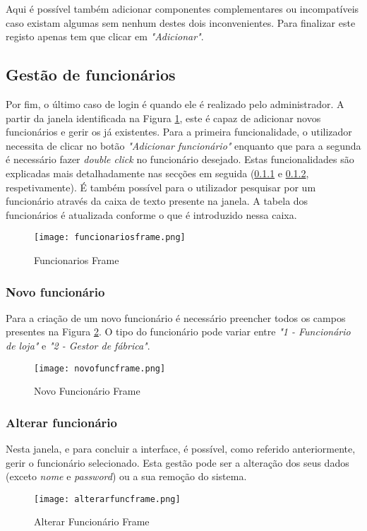 Aqui é possível também adicionar componentes complementares ou incompatíveis caso existam algumas sem nenhum destes dois inconvenientes. Para finalizar este registo apenas tem que clicar em \textit{"Adicionar"}.


\subsection{Gestão de funcionários}
\label{adminsec}

Por fim, o último caso de login é quando ele é realizado pelo administrador. A partir da janela identificada na Figura \ref{funcionariosframe}, este é capaz de adicionar novos funcionários e gerir os já existentes. Para a primeira funcionalidade, o utilizador necessita de clicar no botão \textit{"Adicionar funcionário"} enquanto que para a segunda é necessário fazer \textit{double click} no funcionário desejado. Estas funcionalidades são explicadas mais detalhadamente nas secções em seguida (\ref{novofunc} e \ref{alterafunc}, respetivamente). É também possível para o utilizador pesquisar por um funcionário através da caixa de texto presente na janela. A tabela dos funcionários é atualizada conforme o que é introduzido nessa caixa.


\begin{figure}[H]
	\centering
	\texttt{[image: funcionariosframe.png]}
	\caption{Funcionarios Frame}
	\label{funcionariosframe}
\end{figure}

\subsubsection{Novo funcionário}
\label{novofunc}

Para a criação de um novo funcionário é necessário preencher todos os campos presentes na Figura \ref{novofuncframe}. O tipo do funcionário pode variar entre \textit{"1 - Funcionário de loja"} e \textit{"2 - Gestor de fábrica"}.

\begin{figure}[H]
	\centering
	\texttt{[image: novofuncframe.png]}
	\caption{Novo Funcionário Frame}
	\label{novofuncframe}
\end{figure}


\subsubsection{Alterar funcionário}
\label{alterafunc}

Nesta janela, e para concluir a interface, é possível, como referido anteriormente, gerir o funcionário selecionado. Esta gestão pode ser a alteração dos seus dados (exceto \textit{nome} e \textit{password}) ou a sua remoção do sistema.

\begin{figure}[H]
	\centering
	\texttt{[image: alterarfuncframe.png]}
	\caption{Alterar Funcionário Frame}
	\label{alterarfuncframe}
\end{figure}
\newpage